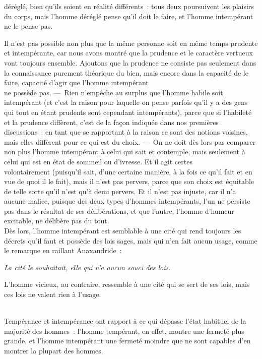 \documentclass[french,twoside]{book} %
\begin{document}
déréglé, bien qu’ils soient en réalité différents : tous deux poursuivent les plaisirs du corps, mais l’homme déréglé pense qu’il doit le faire, et l’homme intempérant ne le pense pas.\par
Il n’est pas possible non plus que la même personne soit en même temps prudente et intempérante, car nous avons montré que la prudence et le caractère vertueux vont toujours ensemble. Ajoutons que la prudence ne consiste pas seulement dans la connaissance purement théorique du bien, mais encore dans la capacité de le faire, capacité d’agir que l’homme intempérant \\
ne possède pas. — Rien n’empêche au surplus que l’homme habile soit intempérant (et c’est la raison pour laquelle on pense parfois qu’il y a des gens qui tout en étant prudents sont cependant intempérants), parce que si l’habileté et la prudence diffèrent, c’est de la façon indiquée dans nos premières discussions : en tant que se rapportant à la raison ce sont des notions voisines, mais elles diffèrent pour ce qui est du choix. — On ne doit dès lors pas comparer non plus l’homme intempérant à celui qui sait et contemple, mais seulement à celui qui est en état de sommeil ou d’ivresse. Et il agit certes \\
volontairement (puisqu’il sait, d’une certaine manière, à la fois ce qu’il fait et en vue de quoi il le fait), mais il n’est pas pervers, parce que son choix est équitable de telle sorte qu’il n’est qu’à demi pervers. Et il n’est pas injuste, car il n’a aucune malice, puisque des deux types d’hommes intempérants, l’un ne persiste pas dans le résultat de ses délibérations, et que l’autre, l’homme d’humeur excitable, ne délibère pas du tout. \\
Dès lors, l’homme intempérant est semblable à une cité qui rend toujours les décrets qu’il faut et possède des lois sages, mais qui n’en fait aucun usage, comme le remarque en raillant Anaxandride :\par
 {\itshape La cité le souhaitait, elle qui n’a aucun souci des lois.} \par
L’homme vicieux, au contraire, ressemble à une cité qui se sert de ses lois, mais ces lois ne valent rien à l’usage.\par
\\
Tempérance et intempérance ont rapport à ce qui dépasse l’état habituel de la majorité des hommes : l’homme tempérant, en effet, montre une fermeté plus grande, et l’homme intempérant une fermeté moindre que ne sont capables d’en montrer la plupart des hommes.\par
\end{document}
